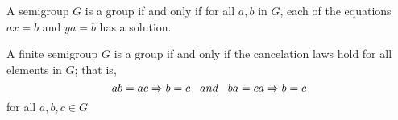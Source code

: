 \begin{teo}
A semigroup $G$ is a group if and only if for all $a,b$ in $G$, each of the equations $ax=b$ and $ya=b$ has a solution.
\end{teo}

\begin{teo}
    A finite semigroup $G$ is a group if and only if the cancelation laws hold for all elements in $G$; that is,
    \begin{equation*}
        ab=ac\Rightarrow b=c \hspace{.3cm} and \hspace{.3cm} ba=ca\Rightarrow b=c
    \end{equation*}
    for all $a,b,c\in G$
\end{teo}